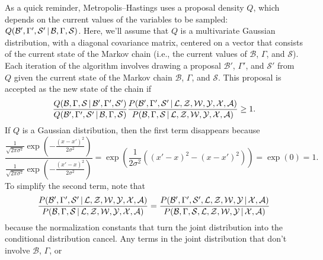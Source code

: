 \documentclass[10pt,english,oneside]{article}
\begin{document}
As a quick reminder, Metropolis--Hastings uses a proposal density $Q$,
which depends on the current values of the variables to be sampled:
$Q(\mathcal{B}', \Gamma', \mathcal{S}' \,|\, \mathcal{B}, \Gamma,
\mathcal{S})$. Here, we'll assume that $Q$ is a multivariate Gaussian
distribution, with a diagonal covariance matrix, centered on a vector
that consists of the current state of the Markov chain (i.e., the
current values of $\mathcal{B}$, $\Gamma$, and $\mathcal{S}$). Each
iteration of the algorithm involves drawing a proposal $\mathcal{B}'$,
$\Gamma'$, and $\mathcal{S}'$ from $Q$ given the current state of the
Markov chain $\mathcal{B}$, $\Gamma$, and $\mathcal{S}$. This proposal
is accepted as the new state of the chain if
\begin{equation}
  \frac{Q(\mathcal{B}, \Gamma, \mathcal{S} \,|\, \mathcal{B}', \Gamma',
    \mathcal{S}')}{Q(\mathcal{B}', \Gamma', \mathcal{S}' \,|\, \mathcal{B},
    \Gamma, \mathcal{S})}
  \frac{P(\mathcal{B}', \Gamma',
    \mathcal{S}' \,|\, \mathcal{L}, \mathcal{Z}, \mathcal{W},
    \mathcal{Y}, \mathcal{X}, \mathcal{A})}{
        P(\mathcal{B}, \Gamma,
    \mathcal{S} \,|\, \mathcal{L}, \mathcal{Z}, \mathcal{W},
    \mathcal{Y}, \mathcal{X}, \mathcal{A})} \geq 1.
\end{equation}
If $Q$ is a Gaussian distribution, then the first term disappears because
\begin{equation}
\frac{\frac{1}{\sqrt{2 \pi \sigma^2}} \exp{\left( - \frac{(x -
      x')^2}{2 \sigma^2} \right)}}{\frac{1}{\sqrt{2 \pi \sigma^2}}
  \exp{\left( - \frac{(x' - x)^2}{2 \sigma^2} \right)}} = \exp{\left(
  \frac{1}{2 \sigma^2} \left( (x' - x)^2 - (x - x')^2\right)\right)} = \exp{(0)} = 1.
\end{equation}
To simplify the second term, note that
\begin{equation}
  \frac{P(\mathcal{B}', \Gamma',
    \mathcal{S}' \,|\, \mathcal{L}, \mathcal{Z}, \mathcal{W},
    \mathcal{Y}, \mathcal{X}, \mathcal{A})}{
        P(\mathcal{B}, \Gamma,
    \mathcal{S} \,|\, \mathcal{L}, \mathcal{Z}, \mathcal{W},
    \mathcal{Y}, \mathcal{X}, \mathcal{A})} =
  \frac{P(\mathcal{B}', \Gamma',
    \mathcal{S}', \mathcal{L}, \mathcal{Z}, \mathcal{W},
    \mathcal{Y} \,|\, \mathcal{X}, \mathcal{A})}{
        P(\mathcal{B}, \Gamma,
    \mathcal{S}, \mathcal{L}, \mathcal{Z}, \mathcal{W},
    \mathcal{Y} \,|\, \mathcal{X}, \mathcal{A})}  
  \end{equation}
because the normalization constants that turn the joint distribution
into the conditional distribution cancel. Any terms in the joint
distribution that don't involve $\mathcal{B}$, $\Gamma$, or
\end{document}
